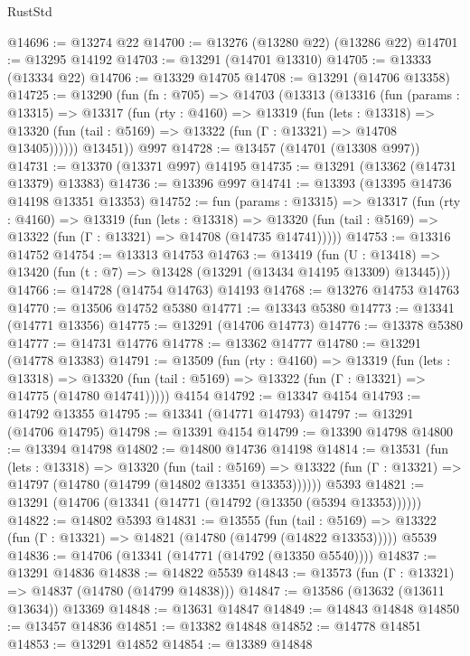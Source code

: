 \begin{lexlean}{RustStd}
\begin{coremodule}
@14696 := @13274 @22
@14700 := @13276 (@13280 @22) (@13286 @22)
@14701 := @13295 @14192
@14703 := @13291 (@14701 @13310)
@14705 := @13333 (@13334 @22)
@14706 := @13329 @14705
@14708 := @13291 (@14706 @13358)
@14725 := @13290
    (fun (fn : @705) =>
    @14703
      (@13313
        (@13316
          (fun (params : @13315) =>
          @13317
            (fun (rty : @4160) =>
            @13319
              (fun (lets : @13318) =>
              @13320 (fun (tail : @5169) => @13322 (fun (Γ : @13321) => @14708 @13405))))))
        @13451))
    @997
@14728 := @13457 (@14701 (@13308 @997))
@14731 := @13370 (@13371 @997) @14195
@14735 := @13291 (@13362 (@14731 @13379) @13383)
@14736 := @13396 @997
@14741 := @13393 (@13395 @14736 @14198 @13351 @13353)
@14752 := fun (params : @13315) =>
  @13317
    (fun (rty : @4160) =>
    @13319
      (fun (lets : @13318) =>
      @13320 (fun (tail : @5169) => @13322 (fun (Γ : @13321) => @14708 (@14735 @14741)))))
@14753 := @13316 @14752
@14754 := @13313 @14753
@14763 := @13419
    (fun (U : @13418) => @13420 (fun (t : @7) => @13428 (@13291 (@13434 @14195 @13309) @13445)))
@14766 := @14728 (@14754 @14763) @14193
@14768 := @13276 @14753 @14763
@14770 := @13506 @14752 @5380
@14771 := @13343 @5380
@14773 := @13341 (@14771 @13356)
@14775 := @13291 (@14706 @14773)
@14776 := @13378 @5380
@14777 := @14731 @14776
@14778 := @13362 @14777
@14780 := @13291 (@14778 @13383)
@14791 := @13509
    (fun (rty : @4160) =>
    @13319
      (fun (lets : @13318) =>
      @13320 (fun (tail : @5169) => @13322 (fun (Γ : @13321) => @14775 (@14780 @14741)))))
    @4154
@14792 := @13347 @4154
@14793 := @14792 @13355
@14795 := @13341 (@14771 @14793)
@14797 := @13291 (@14706 @14795)
@14798 := @13391 @4154
@14799 := @13390 @14798
@14800 := @13394 @14798
@14802 := @14800 @14736 @14198
@14814 := @13531
    (fun (lets : @13318) =>
    @13320
      (fun (tail : @5169) =>
      @13322 (fun (Γ : @13321) => @14797 (@14780 (@14799 (@14802 @13351 @13353))))))
    @5393
@14821 := @13291 (@14706 (@13341 (@14771 (@14792 (@13350 (@5394 @13353))))))
@14822 := @14802 @5393
@14831 := @13555
    (fun (tail : @5169) => @13322 (fun (Γ : @13321) => @14821 (@14780 (@14799 (@14822 @13353)))))
    @5539
@14836 := @14706 (@13341 (@14771 (@14792 (@13350 @5540))))
@14837 := @13291 @14836
@14838 := @14822 @5539
@14843 := @13573 (fun (Γ : @13321) => @14837 (@14780 (@14799 @14838)))
@14847 := @13586 (@13632 (@13611 @13634)) @13369
@14848 := @13631 @14847
@14849 := @14843 @14848
@14850 := @13457 @14836
@14851 := @13382 @14848
@14852 := @14778 @14851
@14853 := @13291 @14852
@14854 := @13389 @14848

\end{coremodule}
\end{lexlean}
